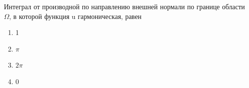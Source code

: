 Интеграл от производной по направлению внешней нормали по границе области \(\Omega\), в которой функция u гармоническая, равен

\begin{enumerate}[label=\arabic*)]
    \item 1
    \item \(\pi\)
    \item \(2\pi\)
    \item 0
\end{enumerate}

